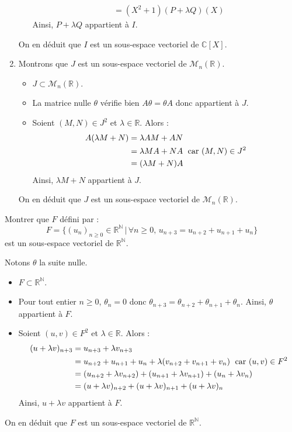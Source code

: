 \documentclass[a4paper,10pt]{report}
\begin{document}
\begin{enumerate}
\begin{itemize}
\begin{align*}
& = (X^2+1)(P+\lambda Q)(X)
\end{align*}
Ainsi, $P+ \lambda Q$ appartient à $I$.
\end{itemize}
On en déduit que $I$ est un sous-espace vectoriel de $\mathbb{C}[X]$.
\item Montrons que $J$ est un sous-espace vectoriel de $\mathcal{M}_n(\mathbb{R})$.
\begin{itemize}
\item $J \subset \mathcal{M}_n(\mathbb{R})$.
\item La matrice nulle $\theta$ vérifie bien $A \theta = \theta A$ donc appartient à $J$.
\item Soient $(M,N) \in J^2$ et $\lambda \in \mathbb{R}$. Alors :
\begin{align*}
A(\lambda M + N) & = \lambda AM + AN \\
& = \lambda MA + NA \; \hbox{ car } (M,N) \in J^2 \\
& = (\lambda M+N) A 
\end{align*}
Ainsi, $\lambda M +N$ appartient à $J$.
\end{itemize}
On en déduit que $J$ est un sous-espace vectoriel de $\mathcal{M}_n(\mathbb{R})$.
\end{enumerate}

\medskip



\begin{Exercice}{} Montrer que $F$ défini par :
$$ F = \lbrace (u_n)_{n \geq 0} \in \mathbb{R}^{\mathbb{N}} \, \vert \, \forall n \geq 0, \, u_{n+3}=u_{n+2}+u_{n+1}+u_n \rbrace$$
est un sous-espace vectoriel de $\mathbb{R}^{\mathbb{N}}$.
\end{Exercice}

\corr Notons $\theta$ la suite nulle.

\begin{itemize}
\item $F \subset \mathbb{R}^{\mathbb{N}}$.
\item Pour tout entier $n \geq 0$, $\theta_n = 0$ donc $\theta_{n+3} = \theta_{n+2} + \theta_{n+1} + \theta_n$. Ainsi, $\theta$ appartient à $F$.
\item Soient $(u,v) \in F^2$ et $\lambda \in \mathbb{R}$. Alors :
\begin{align*}
(u+\lambda v)_{n+3} & = u_{n+3} + \lambda v_{n+3} \\
& = u_{n+2}+u_{n+1}+u_n + \lambda (v_{n+2}+v_{n+1}+v_n) \; \hbox{ car } (u,v) \in F^2 \\
& = (u_{n+2} + \lambda v_{n+2}) + (u_{n+1} + \lambda v_{n+1}) + (u_n + \lambda v_n) \\
& = (u+\lambda v)_{n+2} + (u+\lambda v)_{n+1} + (u+\lambda v)_{n}
\end{align*}
Ainsi, $u+ \lambda v$ appartient à $F$.
\end{itemize}
On en déduit que $F$ est un sous-espace vectoriel de $\mathbb{R}^{\mathbb{N}}$.
\end{document}
